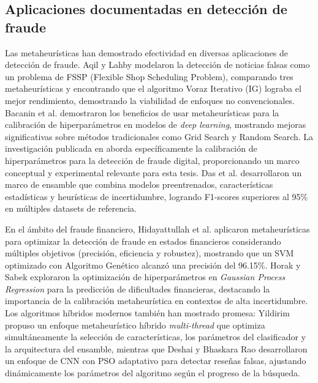 \subsection{Aplicaciones documentadas en detección de fraude}

Las metaheurísticas han demostrado efectividad en diversas aplicaciones de detección de fraude. Aqil y Lahby \cite{aqil2021modeling} modelaron la detección de noticias falsas como un problema de FSSP (Flexible Shop Scheduling Problem), comparando tres metaheurísticas y encontrando que el algoritmo Voraz Iterativo (IG) lograba el mejor rendimiento, demostrando la viabilidad de enfoques no convencionales. Bacanin et al. \cite{bacanin2023benefits} demostraron los beneficios de usar metaheurísticas para la calibración de hiperparámetros en modelos de \textit{deep learning}, mostrando mejoras significativas sobre métodos tradicionales como Grid Search y Random Search. La investigación publicada en \cite{hurtado2024calibracion} aborda específicamente la calibración de hiperparámetros para la detección de fraude digital, proporcionando un marco conceptual y experimental relevante para esta tesis. Das et al. \cite{das2022heuristic} desarrollaron un marco de ensamble que combina modelos preentrenados, características estadísticas y heurísticas de incertidumbre, logrando F1-scores superiores al 95\% en múltiples datasets de referencia.

En el ámbito del fraude financiero, Hidayattullah et al. \cite{hidayattullah2020financial} aplicaron metaheurísticas para optimizar la detección de fraude en estados financieros considerando múltiples objetivos (precisión, eficiencia y robustez), mostrando que un SVM optimizado con Algoritmo Genético alcanzó una precisión del 96.15\%. Horak y Sabek \cite{horak2023gaussian} exploraron la optimización de hiperparámetros en \textit{Gaussian Process Regression} para la predicción de dificultades financieras, destacando la importancia de la calibración metaheurística en contextos de alta incertidumbre. Los algoritmos híbridos modernos también han mostrado promesa: Yildirim \cite{yildirim2023novel} propuso un enfoque metaheurístico híbrido \textit{multi-thread} que optimiza simultáneamente la selección de características, los parámetros del clasificador y la arquitectura del ensamble, mientras que Deshai y Bhaskara Rao \cite{deshai2023unmasking} desarrollaron un enfoque de CNN con PSO adaptativo para detectar reseñas falsas, ajustando dinámicamente los parámetros del algoritmo según el progreso de la búsqueda.

